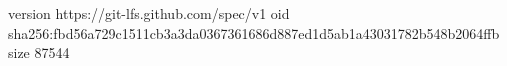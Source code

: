 version https://git-lfs.github.com/spec/v1
oid sha256:fbd56a729c1511cb3a3da0367361686d887ed1d5ab1a43031782b548b2064ffb
size 87544
